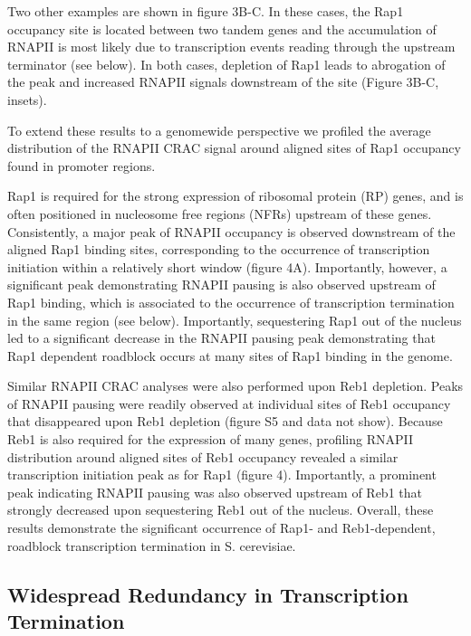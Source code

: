 Two other examples are shown in figure 3B-C. In these cases, the Rap1 occupancy site is located between two tandem genes and the accumulation of RNAPII is most likely due to transcription events reading through the upstream terminator (see below). In both cases, depletion of Rap1 leads to abrogation of the peak and increased RNAPII signals downstream of the site (Figure 3B-C, insets). 

To extend these results to a genomewide perspective we profiled the average distribution of the RNAPII CRAC signal around aligned sites of Rap1 occupancy found in promoter regions.

Rap1 is required for the strong expression of ribosomal protein (RP) genes, and is often positioned in nucleosome free regions (NFRs) upstream of these genes. Consistently, a major peak of RNAPII occupancy is observed downstream of the aligned Rap1 binding sites, corresponding to the occurrence of transcription initiation within a relatively short window (figure 4A). Importantly, however, a significant peak demonstrating RNAPII pausing is also observed upstream of Rap1 binding, which is associated to the occurrence of transcription termination in the same region (see below). Importantly, sequestering Rap1 out of the nucleus led to a significant decrease in the RNAPII pausing peak demonstrating that Rap1 dependent roadblock occurs at many sites of Rap1 binding in the genome.

Similar RNAPII CRAC analyses were also performed upon Reb1 depletion. Peaks of RNAPII pausing were readily observed at individual sites of Reb1 occupancy that disappeared upon Reb1 depletion (figure S5 and data not show). Because Reb1 is also required for the expression of many genes, profiling RNAPII distribution around aligned sites of Reb1 occupancy revealed a similar transcription initiation peak as for Rap1 (figure 4).  Importantly, a prominent peak indicating RNAPII pausing was also observed upstream of Reb1 that strongly decreased upon sequestering Reb1 out of the nucleus. Overall, these results demonstrate the significant occurrence of Rap1- and Reb1-dependent, roadblock transcription termination in S. cerevisiae.


\singlespacing
\subsection*{Widespread Redundancy in Transcription Termination}
\doublespacing

